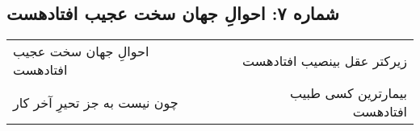 \begin{center}
\section*{شماره ۷: احوالِ جهان سخت عجیب افتادهست}
\label{sec:007}
\begin{longtable}{l p{0.5cm} r}
احوالِ جهان سخت عجیب افتادهست
&&
زیرکتر عقل بینصیب افتادهست
\\
چون نیست به جز تحیرِ آخر کار
&&
بیمارترین کسی طبیب افتادهست
\\
\end{longtable}
\end{center}
